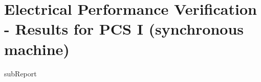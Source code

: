 \renewcommand{\DTRPcs}{ISM} %
\renewcommand{\DTRPcsLong}{I (synchronous machine)}


    \section{Electrical Performance Verification - Results for PCS \DTRPcsLong}

    {{subReport}}
    \newpage

